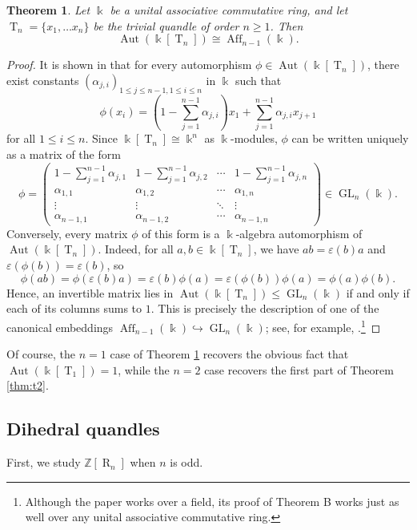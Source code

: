 \documentclass[12 pt]{amsart}
\newtheorem{theorem}{Theorem}[section]
\theoremstyle{definition}
\theoremstyle{remark}
\numberwithin{equation}{section}
\newcommand{\Aut}{\operatorname{Aut}}
\newcommand{\T}{\operatorname{T}}
\newcommand{\R}{\operatorname{R}}
\newcommand{\GL}{\operatorname{GL}}
\newcommand{\Aff}{\operatorname{Aff}}
\newcommand{\Z}{\mathbb{Z}}
\renewcommand{\epsilon}{\varepsilon}
\renewcommand{\k}{\Bbbk}
\begin{document}
\begin{theorem}\label{thm:aff} Let $\k$ be a unital associative commutative ring, and let $\T_n=\{x_1,\dots x_n\}$ be the trivial quandle of order $n\geq 1$. Then
     $$\Aut(\k[\T_{n}])\cong\Aff_{n-1}(\k).$$
\end{theorem}

\begin{proof}
It is shown in \cite[Sec.\ 6]{BPS-1} that for every automorphism $\phi \in \Aut (\k[\T_n])$, there exist constants $(\alpha_{j,i})_{1\leq j\leq n-1,1\leq i\leq n}$ in $\k$ such that
\[
\phi(x_i)=\left(1 -\sum^{n-1}_{j=1}\alpha_{j,i}  \right) x_1+ \sum^{n-1}_{j=1} \alpha_{j,i} x_{j+1}
\]
for all $1\leq i\leq n$. 
Since $\k[\T_n]\cong\k^n$ as $\k$-modules, $\phi$ can be written uniquely as a matrix of the form
\[
\phi =
   \begin{pmatrix}
1 -\sum^{n-1}_{j=1}\alpha_{j,1} & 1 -\sum^{n-1}_{j=1}\alpha_{j,2} & \cdots & 1 -\sum^{n-1}_{j=1}\alpha_{j,n} \\
\alpha_{1,1} & \alpha_{1,2} & \cdots & \alpha_{1,n} \\
\vdots & \vdots & \ddots & \vdots \\
\alpha_{n-1,1} & \alpha_{n-1,2} & \cdots & \alpha_{n-1,n} 
\end{pmatrix}  \in\GL_n(\k).
\]
Conversely, every matrix $\phi$ of this form is a $\k$-algebra automorphism of $\Aut(\k[\T_n])$. Indeed, for all $a,b\in \k[\T_n]$, we have $ab=\epsilon(b)a$ and $\epsilon(\phi(b))=\epsilon(b)$, so 
\[
\phi(ab)=\phi(\epsilon(b)a)=\epsilon(b)\phi(a)=\epsilon(\phi(b))\phi(a)=\phi(a)\phi(b).
\]
Hence, an invertible matrix lies in $\Aut(\k[\T_n])\leq\GL_n(\k)$ if and only if each of its columns sums to $1$. This is precisely the description of one of the canonical embeddings $\Aff_{n-1}(\k)\hookrightarrow\GL_n(\k)$; see, for example, \cite[Thm.\ B]{poole}.\footnote{Although the paper \cite{poole} works over a field, its proof of Theorem B works just as well over any unital associative commutative ring.}
\end{proof}

Of course, the $n=1$ case of Theorem \ref{thm:aff} recovers the obvious fact that $\Aut(\k[\T_1])=1$, while the $n=2$ case recovers the first part of Theorem \ref{thm:t2}.

\subsection{Dihedral quandles} First, we study $\Z[\R_n]$ when $n$ is odd.
\end{document}
